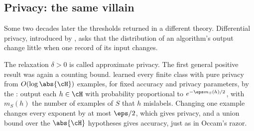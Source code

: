 \begin{refsection}
\subsection{Privacy: the same villain}\label{sec:littlestone:privacy-before}

Some two decades later the thresholds returned in a different theory. Differential privacy, introduced by \textcite{DworkMcSherryNissimSmith2006}, asks that the distribution of an algorithm's output change little when one record of its input changes.


The relaxation $\delta>0$ is called approximate privacy. The first general positive result was again a counting bound. \Textcite{KasiviswanathanLeeNissimRaskhodnikovaSmith2011} learned every finite class with pure privacy from $O(\log\abs{\cH})$ examples, for fixed accuracy and privacy parameters, by the : output each $h\in\cH$ with probability proportional to $e^{-\eps m_S(h)/2}$, with $m_S(h)$ the number of examples of $S$ that $h$ mislabels. Changing one example changes every exponent by at most $\eps/2$, which gives privacy, and a union bound over the $\abs{\cH}$ hypotheses gives accuracy, just as in Occam's razor.


\end{refsection}
